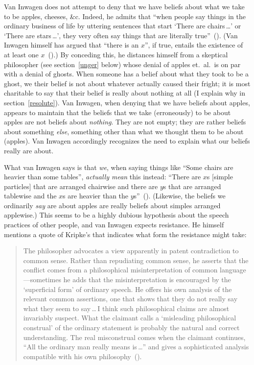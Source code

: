 \documentclass[11pt]{article}
\newenvironment{squote}{\begin{quote}\begin{singlespace}}{\end{singlespace}\end{quote}}
\begin{document}
\begin{spacing}{1.5}
Van Inwagen does not attempt to deny that we have beliefs about what we take to be apples, cheeses, \&c. Indeed, he admits that ``when people say things in the ordinary business of life by uttering sentences that start `There are chairs\,\ldots ' or `There are stars\,\ldots ', they very often say things that are literally true''~(\citeyear[102]{inwagen1995}). (Van Inwagen himself has argued that ``there is an $x$'', if true, entails the existence of at least one $x$~(\citeyear[237--241]{inwagen1998}).) By conceding this, he distances himself from a skeptical philosopher (see section~\ref{unger} below) whose denial of apples et.\ al.\ is on par with a denial of ghosts. When someone has a belief about what they took to be a ghost, we their belief is not about whatever actually caused their fright; it is most charitable to say that their belief is really about nothing at all (I explain why in section~\ref{resolute}). Van Inwagen, when denying that we have beliefs about apples, appears to maintain that the beliefs that we take (erroneously) to be about apples are not beliefs about {\em nothing}. They are not empty; they are rather beliefs about something {\em else}, something other than what we thought them to be about (apples). Van Inwagen accordingly recognizes the need to explain what our beliefs really are about.

What van Inwagen says is that {\em we}, when saying things like ``Some chairs are heavier than some tables'', {\em actually mean} this instead: ``There are $x$s [simple particles] that are arranged chairwise and there are $y$s that are arranged tablewise and the $x$s are heavier than the $y$s''~(\citeyear[109]{inwagen1995}). (Likewise, the beliefs we ordinarily {\em say} are about apples are really beliefs about simples arranged applewise.) This seems to be a highly dubious hypothesis about the speech practices of other people, and van Inwagen expects resistance. He himself mentions a quote of Kripke's that indicates what form the resistance might take:
\begin{squote}
The philosopher advocates a view apparently in patent contradiction to common sense. Rather than repudiating common sense, he asserts that the conflict comes from a philosophical misinterpretation of common language---sometimes he adds that the misinterpretation is encouraged  by the `superficial form' of ordinary speech. He offers his own analysis of the relevant common assertions, one that shows that they do not really say what they seem to say\,\ldots\,I think such philosophical claims are almost invariably suspect. What the claimant calls a `misleading philosophical construal' of the ordinary statement is probably the natural and correct understanding. The real misconstrual comes when the claimant continues, ``All the ordinary man really means is\,\ldots '' and gives a sophisticated analysis compatible with his own philosophy~(\citeyear[65]{kripke1982}).
\end{squote}


\end{spacing}
\end{document}
